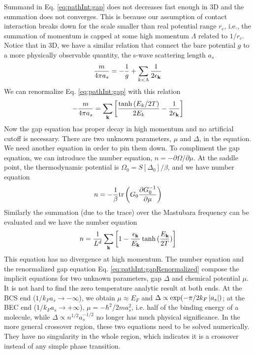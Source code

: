 Summand in Eq. \ref{eq:pathInt:gap} does not decreases fast enough in 3D and the summation does not converges.  This is because our assumption of contact interaction breaks down for the scale smaller than real potential range $r_{c}$, i.e., the summation of momentum is capped at some high momentum $\Lambda$ related to $1/r_{c}$.  Notice that in 3D, we have a similar relation that connect the bare potential $g$ to a more physically observable quantity, the s-wave scattering length $a_{s}$
\begin{equation}\label{eq:pathInt:as}
\frac{m}{4\pi{}a_{s}}=-\frac{1}{g}+\sum_{k<\Lambda}\frac{1}{2\epsilon_{\mathbf{k}}}
\end{equation}
We can renormalize Eq. \ref{eq:pathInt:gap} with this relation
\begin{equation}\label{eq:pathInt:gapRenormalized}
-\frac{m}{4\pi{}a_{s}}=\sum_{\mathbf{k}}\left[\frac{\tanh{(E_k/2T)}}{2E_k}-\frac{1}{2\epsilon_{\mathbf{k}}}\right]
\end{equation}
Now the gap equation has proper decay in high momentum and no artificial cutoff is necessary.  There are two unknown parameters, $\mu$ and $\Delta$,  in the equation.  We need another equation in order to pin them down. To compliment the gap equation, we can introduce the number equation, $n=-\partial\Omega/\partial\mu$. At the saddle point, the thermodynamic potential is $\Omega_{0}=S[\Delta_{0}]/\beta$, and we have number equation
\begin{equation*}
n=-\frac{1}{\beta}\text{tr}\left({G_{0}\frac{\partial{G_{0}^{-1}}}{\partial{\mu}}}\right)
\end{equation*}
Similarly the summation (due to the trace) over the Mastubara frequency can be evaluated and we have the number equation
\begin{equation}
n=\frac{1}{L^{d}}\sum_{\mathbf{k}}\left[1-\frac{\epsilon_{\mathbf{k}}}{E_{\mathbf{k}}}\tanh{(\frac{E_{\ensuremath{\mathbf{k}}}}{2T})}\right]
\end{equation}
This equation has no divergence at high momentum.  The number equation  and the renormalized gap equation Eq. \ref{eq:pathInt:gapRenormalized} compose the implicit equations for two unknown parameters, gap $\Delta$ and chemical potential $\mu$.  It is not hard to find the zero temperature analytic result at both ends.  At the BCS end ($1/k_{F}a_{s}\rightarrow-\infty$), we obtain $\mu\approx{}E_{F}$ and $\Delta\propto\exp(-\pi/2k_{F}\left\lvert{a_{s}}\right\rvert)$; at the BEC end ($1/k_{F}a_{s}\rightarrow+\infty$),  $\mu=-\hbar^{2}/2ma_{s}^{2}$, i.e. half of the binding energy of a molecule, while $\Delta\propto{}n^{1/2}a_{s}^{-1/2}$ no longer has  much physical significance.  In the more general crossover region, these two equations need to be solved numerically.  They have no singularity in the whole region, which indicates it is a crossover instead of any simple phase transition.  



